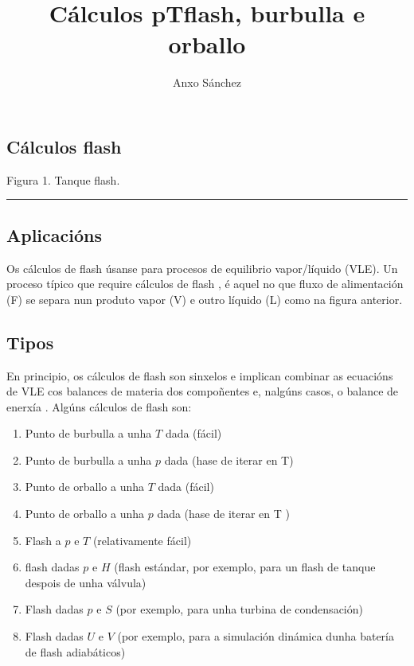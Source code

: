 \documentclass[
  letterpaper,
  DIV=11,
  numbers=noendperiod]{scrartcl}
\title{Cálculos pTflash, burbulla e orballo}
\author{Anxo Sánchez}
\date{}
\providecommand{\tightlist}{%
  \setlength{\itemsep}{0pt}\setlength{\parskip}{0pt}}\usepackage{longtable,booktabs,array}
\begin{document}
\maketitle

\subsection{Cálculos flash}\label{cuxe1lculos-flash}

Figura 1. Tanque flash.

\begin{center}\rule{0.5\linewidth}{0.5pt}\end{center}

\subsection{Aplicacións}\label{aplicaciuxf3ns}

Os cálculos de flash úsanse para procesos de equilibrio vapor/líquido
(VLE). Un proceso típico que require cálculos de flash , é aquel no que
fluxo de alimentación (F) se separa nun produto vapor (V) e outro
líquido (L) como na figura anterior.

\subsection{Tipos}\label{tipos}

En principio, os cálculos de flash son sinxelos e implican combinar as
ecuacións de VLE cos balances de materia dos compoñentes e, nalgúns
casos, o balance de enerxía . Algúns cálculos de flash son:

\begin{enumerate}
\def\labelenumi{\arabic{enumi}.}
\tightlist
\item
  Punto de burbulla a unha \(T\) dada (fácil)\\
\item
  Punto de burbulla a unha \(p\) dada (hase de iterar en T)
\item
  Punto de orballo a unha \(T\) dada (fácil)
\item
  Punto de orballo a unha \(p\) dada (hase de iterar en T )
\item
  Flash a \(p\) e \(T\) (relativamente fácil)
\item
  flash dadas \(p\) e \(H\) (flash estándar, por exemplo, para un flash
  de tanque despois de unha válvula)
\item
  Flash dadas \(p\) e \(S\) (por exemplo, para unha turbina de
  condensación)
\item
  Flash dadas \(U\) e \(V\) (por exemplo, para a simulación dinámica
  dunha batería de flash adiabáticos)
\end{enumerate}
\end{document}
